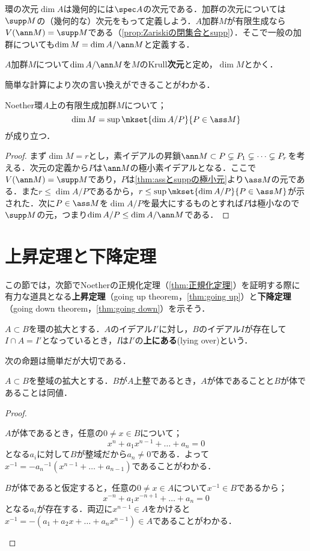 環の次元$\dim A$は幾何的には$\spec A$の次元である．加群の次元については$\supp M$の（幾何的な）次元をもって定義しよう．$A$加群$M$が有限生成なら$V(\ann M)=\supp M$である（\ref{prop:Zariskiの閉集合とsupp}）．そこで一般の加群についても$\dim M=\dim A/\ann M$と定義する．

\begin{defi}[加群のKrull次元]
	$A$加群$M$について$\dim A/\ann M$を$M$のKrull\textbf{次元}と定め，$\dim M$とかく．
\end{defi}

簡単な計算により次の言い換えができることがわかる．

\begin{prop}
	Noether環$A$上の有限生成加群$M$について；
	\[\dim M=\sup\mkset{\dim A/P}{P\in\ass M}\]
	が成り立つ．
\end{prop}
\begin{proof}
	まず$\dim M=r$とし，素イデアルの昇鎖$\ann M \subset P\subsetneq P_1\subsetneq\dots\subsetneq P_r$を考える．次元の定義から$P$は$\ann M$の極小素イデアルとなる．ここで$V(\ann M)=\supp M$であり，$P$は\ref{thm:assとsuppの極小元}より$\ass M$の元である．また$r\leq \dim A/P$であるから，$r\leq\sup\mkset{\dim A/P}{P\in\ass M}$が示された．次に$P\in\ass M$を$\dim A/P$を最大にするものとすれば$P$は極小なので$\supp M$の元，つまり$\dim A/P\leq\dim A/\ann M$である．
\end{proof}

\section{上昇定理と下降定理}
この節では，次節でNoetherの正規化定理（\ref{thm:正規化定理}）を証明する際に有力な道具となる\textbf{上昇定理}（going up theorem，\ref{thm:going up}）と\textbf{下降定理}（going down theorem，\ref{thm:going down}）を示そう．

\begin{defi}
	$A\subset B$を環の拡大とする．$A$のイデアル$I'$に対し，$B$のイデアル$I$が存在して$I\cap A=I'$となっているとき，$I$は$I'$の\textbf{上にある}(lying over)という．
\end{defi}

次の命題は簡単だが大切である．
\begin{prop}\label{prop:整域の整拡大と体}
	$A\subset B$を整域の拡大とする．$B$が$A$上整であるとき，$A$が体であることと$B$が体であることは同値．
\end{prop}

\begin{proof}
	\begin{eqv}
		\item $A$が体であるとき，任意の$0\neq x\in B$について；
		\[x^n+a_1x^{n-1}+\dots+a_n=0\]
		となる$a_i$に対して$B$が整域だから$a_n\neq0$である．よって$x^{-1}=-{a_n}^{-1}(x^{n-1}+\dots+a_{n-1})$であることがわかる．
		
		\item $B$が体であると仮定すると，任意の$0\neq x\in A$について$x^{-1}\in B$であるから；
		\[x^{-n}+a_1x^{-n+1}+\dots+a_n=0\]
		となる$a_i$が存在する．両辺に$x^{n-1}\in A$をかけると$x^{-1}=-(a_1+a_2x+\dots+a_nx^{n-1})\in A$であることがわかる．
	\end{eqv}
\end{proof}

